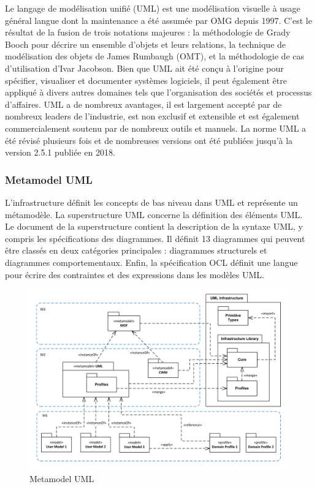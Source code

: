 \documentclass[french]{spimufcphdthesis}
\begin{document}
 Le langage de modélisation unifié (UML) est une modélisation visuelle à usage général langue dont la maintenance a été assumée par OMG depuis 1997. C'est le résultat de la fusion de trois notations majeures : la méthodologie de Grady Booch pour décrire un ensemble d'objets et leurs relations, la technique de modélisation des objets de James Rumbaugh (OMT), et la méthodologie de cas d'utilisation d'Ivar Jacobson.
Bien que UML ait été conçu à l'origine pour spécifier, visualiser et documenter systèmes logiciels, il peut également être appliqué à divers autres domaines tels que l’organisation des sociétés et processus d'affaires. UML a de nombreux avantages, il est largement accepté par de nombreux leaders de l'industrie, est non exclusif et extensible et est également commercialement soutenu par de nombreux outils et manuels. La norme UML a été révisé plusieurs fois et de nombreuses versions ont été publiées jusqu’à la version 2.5.1 publiée en 2018. 

\subsubsection{Metamodel UML}

 L'infrastructure définit les concepts de bas niveau dans UML et représente un métamodèle. La superstructure UML concerne la définition des éléments UML. Le document de la superstructure contient la description de la syntaxe UML, y compris les spécifications des diagrammes. Il définit 13 diagrammes qui peuvent être classés en deux catégories principales : diagrammes structurels et diagrammes comportementaux. Enfin, la spécification OCL définit une langue pour écrire des contraintes et des expressions dans les modèles UML.

\begin{figure}[H]
\begin{center}
\includegraphics[scale=0.5]{figures/Metamodel.png}
\caption{Metamodel UML}
\label{UML_meta}
\end{center}
\end{figure}
\end{document}
